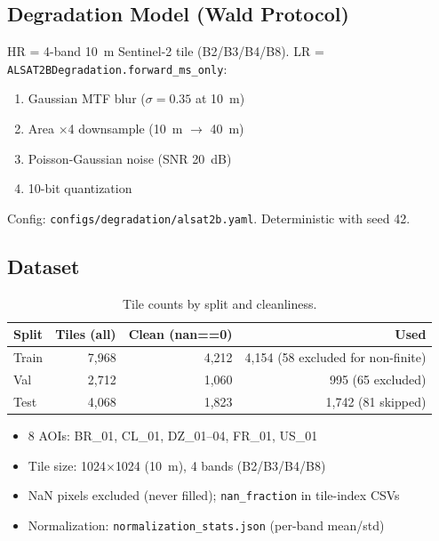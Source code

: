 \subsection{Degradation Model (Wald Protocol)}
HR = 4-band 10~m Sentinel-2 tile (B2/B3/B4/B8). LR = \texttt{ALSAT2BDegradation.forward\_ms\_only}:
\begin{enumerate}
    \item Gaussian MTF blur ($\sigma = 0.35$ at 10~m)
    \item Area $\times$4 downsample (10~m $\to$ 40~m)
    \item Poisson-Gaussian noise (SNR 20~dB)
    \item 10-bit quantization
\end{enumerate}
Config: \texttt{configs/degradation/alsat2b.yaml}. Deterministic with seed 42.

\subsection{Dataset}
\begin{table}[h]
\centering
\caption{Tile counts by split and cleanliness.}
\label{tab:tiles}
\begin{tabular}{lrrr}
\toprule
Split & Tiles (all) & Clean (nan==0) & Used \\
\midrule
Train & 7,968 & 4,212 & 4,154 (58 excluded for non-finite) \\
Val   & 2,712 & 1,060 & 995 (65 excluded) \\
Test  & 4,068 & 1,823 & 1,742 (81 skipped) \\
\bottomrule
\end{tabular}
\end{table}
\begin{itemize}
    \item 8 AOIs: BR\_01, CL\_01, DZ\_01--04, FR\_01, US\_01
    \item Tile size: 1024$\times$1024 (10~m), 4 bands (B2/B3/B4/B8)
    \item NaN pixels excluded (never filled); \texttt{nan\_fraction} in tile-index CSVs
    \item Normalization: \texttt{normalization\_stats.json} (per-band mean/std)
\end{itemize}

